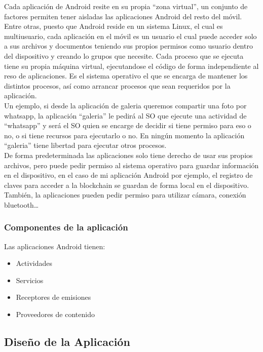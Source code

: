 Cada aplicación de Android resite en su propia ``zona virtual'', un conjunto de factores permiten tener aisladas las aplicaciones Android del resto del móvil. Entre otras, puesto que Android reside en un sistema Linux, el cual es multiusuario, cada aplicación en el móvil es un usuario el cual puede acceder solo a sus archivos y documentos teniendo sus propios permisos como usuario dentro del dispositivo y creando lo grupos que necesite. Cada proceso que se ejecuta tiene su propia máquina virtual, ejecutandose el código de forma independiente al reso de aplicaciones. Es el sistema operativo el que se encarga de mantener los distintos procesos, así como arrancar procesos que sean requeridos por la aplicación. \\

Un ejemplo, si desde la aplicación de galeria queremos compartir una foto por whatsapp, la aplicación ``galeria'' le pedirá al SO que ejecute una actividad de ``whatsapp'' y será el SO quien se encarge de decidir si tiene permiso para eso o no, o si tiene recursos para ejecutarlo o no. En ningún momento la aplicación ``galeria'' tiene libertad para ejecutar otros procesos. \\

De forma predeterminada las aplicaciones solo tiene derecho de usar sus propios archivos, pero puede pedir permiso al sistema operativo para guardar información en el dispositivo, en el caso de mi aplicación Android por ejemplo, el registro de claves para acceder a la blockchain se guardan de forma local en el dispositivo. También, la aplicaciones pueden pedir permiso para utilizar cámara, conexión bluetooth\dots

\subsubsection{Componentes de la aplicación}

Las aplicaciones Android tienen:
\begin{itemize}
    \item Actividades
    \item Servicios
    \item Receptores de emisiones
    \item Proveedores de contenido
\end{itemize}

\subsection{Diseño de la Aplicación}
